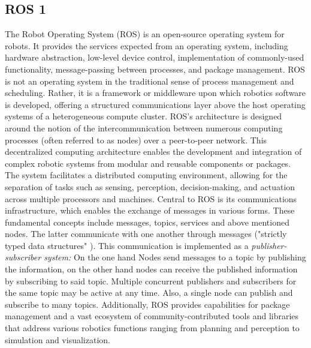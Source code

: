 \documentclass[%
paper=A4,               %
twoside=true,           %
openright,              %
11pt,                   %
bibliography=totoc,     %
titlepage=on,           %
DIV=12,                 %
BCOR=1.5cm,             %
parskip=half,            %
final
]{scrreprt}
\begin{document}
	\subsection{ROS 1}
	The Robot Operating System (ROS) is an open-source operating system for robots. It provides the services expected from an operating system, including hardware abstraction, low-level device control, implementation of commonly-used functionality, message-passing between processes, and package management. ROS is not an operating system in the traditional sense of process management and scheduling. Rather, it is a framework or middleware upon which robotics software is developed, offering a structured communications layer above the host operating systems of a heterogeneous compute cluster. \autocite{quigleyROSOpensourceRobot2009,ros.orgIntroductionROS2024}
	ROS's architecture is designed around the notion of the intercommunication between numerous computing processes (often referred to as nodes) over a peer-to-peer network. This decentralized computing architecture enables the development and integration of complex robotic systems from modular and reusable components or packages. The system facilitates a distributed computing environment, allowing for the separation of tasks such as sensing, perception, decision-making, and actuation across multiple processors and machines. \autocite{quigleyROSOpensourceRobot2009}
	Central to ROS is its communications infrastructure, which enables the exchange of messages in various forms. These fundamental concepts include messages, topics, services and above mentioned nodes. The latter communicate with one another through messages ("strictly typed data structures" \autocite{quigleyROSOpensourceRobot2009}). This communication is implemented as a \textit{publisher-subscriber system:} On the one hand Nodes send messages to a topic by publishing the information, on the other hand nodes can receive the published information by subscribing to said topic. Multiple concurrent publishers and subscribers for the same topic may be active at any time. Also, a single node can publish and subscribe to many topics. \autocite{quigleyROSOpensourceRobot2009}
	Additionally, ROS provides capabilities for package management and a vast ecosystem of community-contributed tools and libraries that address various robotics functions ranging from planning and perception to simulation and visualization.
	\autocite{quigleyROSOpensourceRobot2009,ros.orgIntroductionROS2024}
	
\end{document}
